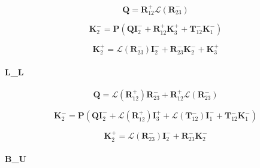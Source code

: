 \begin{equation}
\mathbf{Q} = \mathbf{R}^{+}_{12}\mathcal{L}(\mathbf{R}^{-}_{23})
\label{eq:radiance-boa_radiance-tangent_linear-u_b_P}
\end{equation}

\begin{equation}
\mathbf{K}^{-}_{2} = \mathbf{P}(\mathbf{Q}\mathbf{I}^{-}_{2} + \mathbf{R}^{+}_{12}\mathbf{K}^{+}_{3} + \mathbf{T}^{-}_{12}\mathbf{K}^{-}_{1})
\label{eq:radiance-boa_radiance-tangent_linear-u_b_K_m_2}
\end{equation}

\begin{equation}
\mathbf{K}^{+}_{2} = \mathcal{L}(\mathbf{R}^{-}_{23})\mathbf{I}^{-}_{2} + \mathbf{R}^{-}_{23}\mathbf{K}^{-}_{2} + \mathbf{K}^{+}_{3}
\label{eq:radiance-boa_radiance-tangent_linear-u_b_K_p_2}
\end{equation}


\paragraph{L\_L}
\label{sec:radiance-boa_radiance-tangent_linear-l_l}

\begin{equation}
\mathbf{Q} = \mathcal{L}(\mathbf{R}^{+}_{12})\mathbf{R}^{-}_{23} + \mathbf{R}^{+}_{12}\mathcal{L}(\mathbf{R}^{-}_{23})
\label{eq:radiance-boa_radiance-tangent_linear-l_l_P}
\end{equation}

\begin{equation}
\mathbf{K}^{-}_{2} = \mathbf{P}(\mathbf{Q}\mathbf{I}^{-}_{2} + \mathcal{L}(\mathbf{R}^{+}_{12})\mathbf{I}^{+}_{3} + \mathcal{L}(\mathbf{T}^{-}_{12})\mathbf{I}^{-}_{1} + \mathbf{T}^{-}_{12}\mathbf{K}^{-}_{1})
\label{eq:radiance-boa_radiance-tangent_linear-l_l_K_m_2}
\end{equation}

\begin{equation}
\mathbf{K}^{+}_{2} = \mathcal{L}(\mathbf{R}^{-}_{23})\mathbf{I}^{-}_{2} + \mathbf{R}^{-}_{23}\mathbf{K}^{-}_{2}
\label{eq:radiance-boa_radiance-tangent_linear-l_l_K_p_2}
\end{equation}



\paragraph{B\_U}
\label{sec:radiance-boa_radiance-tangent_linear-b_u}

